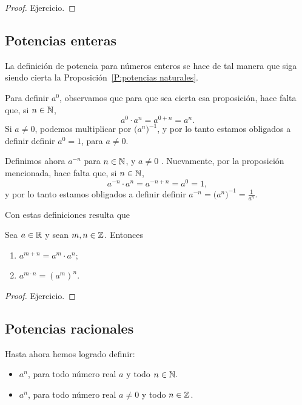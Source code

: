 \begin{proof}
    Ejercicio.
\end{proof}


\subsection{Potencias enteras}

La definición de potencia para números enteros se hace de tal manera que siga siendo cierta la Proposición~\ref{P:potencias naturales}.

Para definir $a^0$, observamos que para que sea cierta esa proposición, hace falta que, si $n\in\mathbb{N}$,
\[
a^0 \cdot a^n = a^{0+n} = a^n.
\]
Si $a\neq 0$, podemos multiplicar por $\big(a^n\big)^{-1}$,
y por lo tanto estamos obligados a definir definir $a^0 = 1$, para $a\neq 0$.

Definimos ahora $a^{-n}$ para $n\in \mathbb{N}$, y $a\neq 0$
. Nuevamente, por la proposición mencionada, hace falta que, si $n\in\mathbb{N}$,
\[
a^{-n} \cdot a^n = a^{-n+n} = a^0 = 1,
\]
y por lo tanto estamos obligados a definir definir $a^{-n} = \big( a^n \big)^{-1} = \frac{1}{a^n}$.

Con estas definiciones resulta que

\begin{proposition}\label{P:potencias enteras}
    Sea $a\in\mathbb{R}$ y sean $m,n\in \mathbb{Z}$. Entonces
    \begin{enumerate}[{\rm (i)}]
        \item $a^{m+n} = a^m \cdot a^n$;
        \item $a^{m\cdot n} = (a^m)^n$.
    \end{enumerate}
\end{proposition}

\begin{proof}
    Ejercicio.
\end{proof}

\subsection{Potencias racionales}

Hasta ahora hemos logrado definir:
\begin{itemize}
    \item $a^n$, para todo número real $a$ y todo $n\in \mathbb{N}$.
    \item $a^n$, para todo número real $a\neq 0$ y todo $n \in \mathbb{Z}$. 
\end{itemize}

